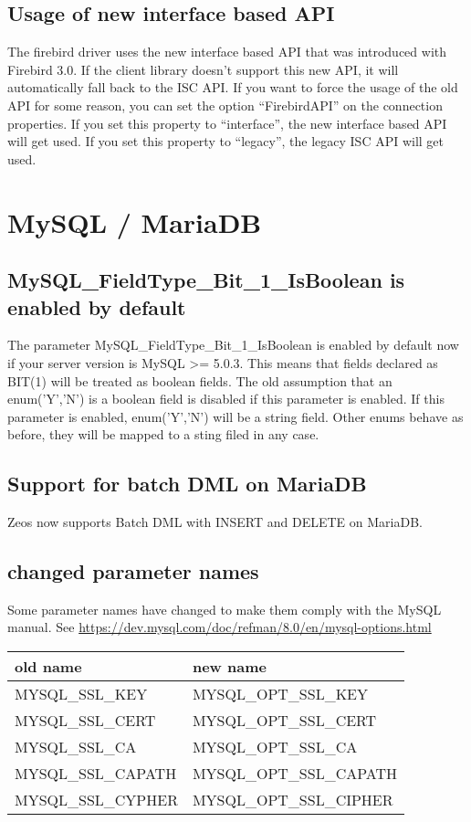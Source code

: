 \documentclass[a4paper,12pt,oneside]{article}
\begin{document}
\subsection{Usage of new interface based API}
The firebird driver uses the new interface based API that was introduced with Firebird 3.0.
If the client library doesn't support this new API, it will automatically fall back to the ISC API.
If you want to force the usage of the old API for some reason, you can set the option "`FirebirdAPI"' on the connection properties.
If you set this property to "`interface"', the new interface based API will get used.
If you set this property to "`legacy"', the legacy ISC API will get used.

\section{MySQL / MariaDB}

\subsection{MySQL\_FieldType\_Bit\_1\_IsBoolean is enabled by default}

The parameter MySQL\_FieldType\_Bit\_1\_IsBoolean is enabled by default now if your server version is MySQL >= 5.0.3.
This means that fields declared as BIT(1) will be treated as boolean fields.
The old assumption that an enum('Y','N') is a boolean field is disabled if this parameter is enabled.
If this parameter is enabled, enum('Y','N') will be a string field.
Other enums behave as before, they will be mapped to a sting filed in any case.

\subsection{Support for batch DML on MariaDB}
Zeos now supports Batch DML with INSERT and DELETE on MariaDB.

\subsection{changed parameter names}
Some parameter names have changed to make them comply with the MySQL manual.
See \url{https://dev.mysql.com/doc/refman/8.0/en/mysql-options.html}

\begin{tabular}{ll}
	old name & new name \\ \hline
  MYSQL\_SSL\_KEY & MYSQL\_OPT\_SSL\_KEY\\
	MYSQL\_SSL\_CERT & MYSQL\_OPT\_SSL\_CERT \\
	MYSQL\_SSL\_CA & MYSQL\_OPT\_SSL\_CA \\
	MYSQL\_SSL\_CAPATH & MYSQL\_OPT\_SSL\_CAPATH \\
	MYSQL\_SSL\_CYPHER & MYSQL\_OPT\_SSL\_CIPHER \\
\end{tabular}
\end{document}

